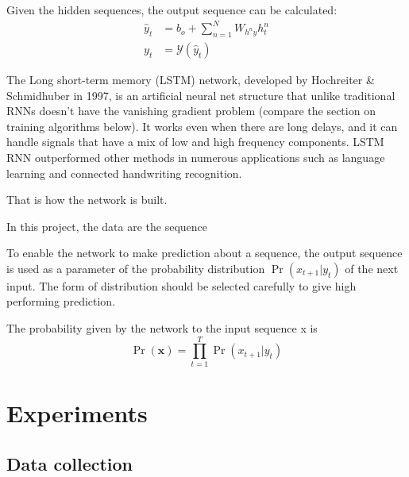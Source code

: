 \documentclass{article} %
\begin{document}
Given the hidden sequences, the output sequence can be calculated: 
\begin{align}
\label{eq:pred_output}
\hat{y}_t &= b_o + \sum_{n=1}^N{W_{h^n y} h^n_t}\\
y_t &= \mathcal{Y}(\hat{y}_t)	
\end{align}

The Long short-term memory (LSTM) network, developed by Hochreiter \& Schmidhuber in 1997, is an artificial neural net structure that unlike traditional RNNs doesn't have the vanishing gradient problem (compare the section on training algorithms below). It works even when there are long delays, and it can handle signals that have a mix of low and high frequency components. LSTM RNN outperformed other methods in numerous applications such as language learning and connected handwriting recognition.


That is how the network is built. 

In this project, the data are the sequence 

To enable the network to make prediction about a sequence, the output sequence is used as a parameter of the probability distribution $\Pr(x_{t+1}|y_t)$ of the next input. The form of distribution should be selected carefully to give high performing prediction. 

The probability given by the network to the input sequence x is
\begin{equation}
\Pr(\mathbf{x}) = \prod_{t=1}^T{\Pr(x_{t+1}|y_t)}
\end{equation}



\section{Experiments}
\subsection{Data collection}
\end{document}
